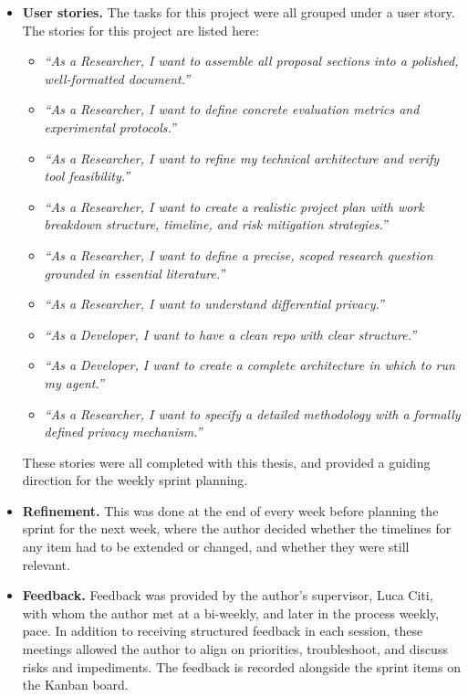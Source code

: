 \begin{itemize}
    \item \textbf{User stories.} The tasks for this project were all grouped
    under a user story. The stories for this project are listed here:
    \begin{itemize}
        \item \textit{``As a Researcher, I want to assemble all proposal
        sections into a polished, well-formatted document.''}
        \item \textit{``As a Researcher, I want to define concrete evaluation
        metrics and experimental protocols.''}
        \item \textit{``As a Researcher, I want to refine my technical
        architecture and verify tool feasibility.''}
        \item \textit{``As a Researcher, I want to create a realistic project
        plan with work breakdown structure, timeline, and risk mitigation
        strategies.''}
        \item \textit{``As a Researcher, I want to define a precise, scoped
        research question grounded in essential literature.''}
        \item \textit{``As a Researcher, I want to understand differential
        privacy.''}
        \item \textit{``As a Developer, I want to have a clean repo with clear
        structure.''}
        \item \textit{``As a Developer, I want to create a complete architecture
        in which to run my agent.''}
        \item \textit{``As a Researcher, I want to specify a detailed
        methodology with a formally defined privacy mechanism.''}
    \end{itemize}
    These stories were all completed with this thesis, and provided a guiding
    direction for the weekly sprint planning.

    \item \textbf{Refinement.} This was done at the end of every week before
    planning the sprint for the next week, where the author decided whether the
    timelines for any item had to be extended or changed, and whether they were
    still relevant.

    \item \textbf{Feedback.} Feedback was provided by the author's supervisor,
    Luca Citi, with whom the author met at a bi-weekly, and later in the process
    weekly, pace. In addition to receiving structured feedback in each session,
    these meetings allowed the author to align on priorities, troubleshoot, and
    discuss risks and impediments. The feedback is recorded alongside the sprint
    items on the Kanban board.
\end{itemize}

